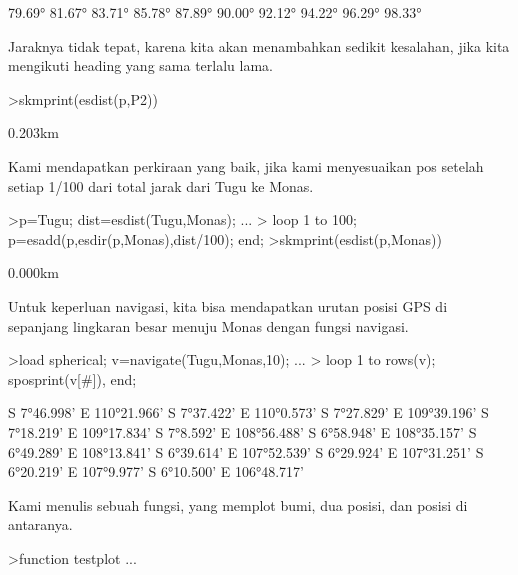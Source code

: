 \documentclass[a4paper,10pt]{article}
\begin{document}
\begin{eulernotebook}
\begin{eulercomment}
\begin{eulercomment}
\begin{euleroutput}
       79.69°
       81.67°
       83.71°
       85.78°
       87.89°
       90.00°
       92.12°
       94.22°
       96.29°
       98.33°
\end{euleroutput}
\begin{eulercomment}
Jaraknya tidak tepat, karena kita akan menambahkan sedikit kesalahan,
jika kita mengikuti heading yang sama terlalu lama.
\end{eulercomment}
\begin{eulerprompt}
>skmprint(esdist(p,P2))
\end{eulerprompt}
\begin{euleroutput}
       0.203km
\end{euleroutput}
\begin{eulercomment}
Kami mendapatkan perkiraan yang baik, jika kami menyesuaikan pos
setelah setiap 1/100 dari total jarak dari Tugu ke Monas.
\end{eulercomment}
\begin{eulerprompt}
>p=Tugu; dist=esdist(Tugu,Monas); ...
>  loop 1 to 100; p=esadd(p,esdir(p,Monas),dist/100); end;
>skmprint(esdist(p,Monas))
\end{eulerprompt}
\begin{euleroutput}
       0.000km
\end{euleroutput}
\begin{eulercomment}
Untuk keperluan navigasi, kita bisa mendapatkan urutan posisi GPS di
sepanjang lingkaran besar menuju Monas dengan fungsi navigasi.
\end{eulercomment}
\begin{eulerprompt}
>load spherical; v=navigate(Tugu,Monas,10); ...
>  loop 1 to rows(v); sposprint(v[#]), end;
\end{eulerprompt}
\begin{euleroutput}
  S 7°46.998' E 110°21.966'
  S 7°37.422' E 110°0.573'
  S 7°27.829' E 109°39.196'
  S 7°18.219' E 109°17.834'
  S 7°8.592' E 108°56.488'
  S 6°58.948' E 108°35.157'
  S 6°49.289' E 108°13.841'
  S 6°39.614' E 107°52.539'
  S 6°29.924' E 107°31.251'
  S 6°20.219' E 107°9.977'
  S 6°10.500' E 106°48.717'
\end{euleroutput}
\begin{eulercomment}
Kami menulis sebuah fungsi, yang memplot bumi, dua posisi, dan posisi
di antaranya.
\end{eulercomment}
\begin{eulerprompt}
>function testplot ...
\end{eulerprompt}

\end{eulercomment}
\end{eulercomment}
\end{eulernotebook}
\end{document}
